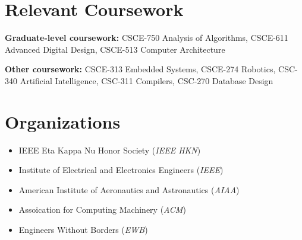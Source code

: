 \documentclass[letterpaper,11pt]{article}
\newcommand{\resumeOrganizationHeading}[2]{
  \vspace{-2pt}\item
    #1 (\textit{#2}) \\
}
\newcommand{\resumeSubHeadingListStart}{\begin{itemize}[leftmargin=0.15in, label={}]}
\newcommand{\resumeSubHeadingListEnd}{\end{itemize}}
\begin{document}
\section{Relevant Coursework}
  \vspace{2pt}
  \resumeSubHeadingListStart
    \small{\item{
        \textbf{Graduate-level coursework:}{ CSCE-750 Analysis of Algorithms, CSCE-611 Advanced Digital Design, CSCE-513 Computer Architecture} \\ \vspace{3pt}
        
        \textbf{Other coursework:}{ CSCE-313 Embedded Systems, CSCE-274 Robotics, CSC-340 Artificial Intelligence, CSC-311 Compilers, CSC-270 Database Design}
    }}
  \resumeSubHeadingListEnd




    
    




\section{Organizations}
  \resumeSubHeadingListStart
    
    \resumeOrganizationHeading
      {IEEE Eta Kappa Nu Honor Society}{IEEE HKN}
    \resumeOrganizationHeading
      {Institute of Electrical and Electronics Engineers}{IEEE}
    \resumeOrganizationHeading
      {American Institute of Aeronautics and Astronautics}{AIAA}
    \resumeOrganizationHeading
      {Assoication for Computing Machinery}{ACM}
    \resumeOrganizationHeading
      {Engineers Without Borders}{EWB}
    
  \resumeSubHeadingListEnd




\end{document}
